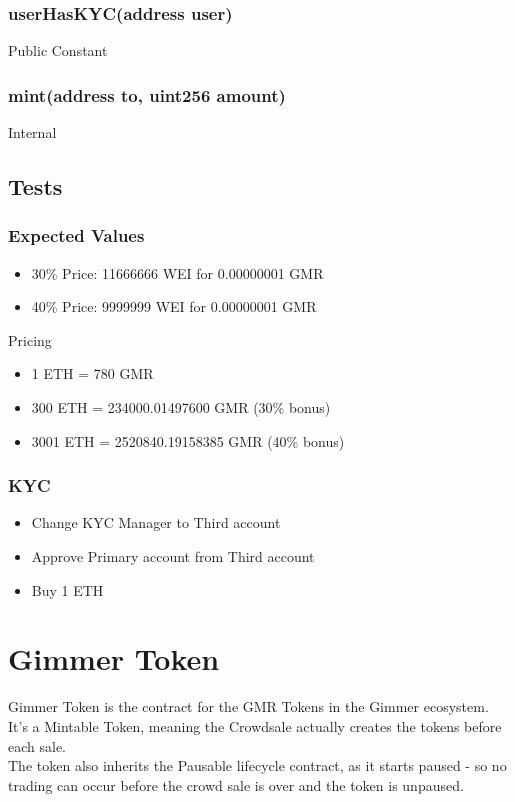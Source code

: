 \documentclass[11pt]{article} %
\begin{document}
\subsubsection{userHasKYC(address user)}
Public Constant

\subsubsection{mint(address to, uint256 amount)}
Internal

\subsection{Tests}

\subsubsection{Expected Values}

\begin{itemize}
    \item 30\% Price: 11666666 WEI for 0.00000001 GMR
    \item 40\% Price:  9999999 WEI for 0.00000001 GMR
\end{itemize}

Pricing
\begin{itemize}
    \item 1 ETH = 780 GMR
    \item 300 ETH = 234000.01497600 GMR (30\% bonus)
    \item 3001 ETH = 2520840.19158385 GMR (40\% bonus)
\end{itemize}

\subsubsection{KYC}
\begin{itemize}
    \item Change KYC Manager to Third account
    \item Approve Primary account from Third account
    \item Buy 1 ETH
\end{itemize}


\section{Gimmer Token}

Gimmer Token is the contract for the GMR Tokens in the Gimmer ecosystem.\\
It's a Mintable Token, meaning the Crowdsale actually creates the tokens before each sale.\\
The token also inherits the Pausable lifecycle contract, as it starts paused - so no trading can occur before the crowd sale is over and the token is unpaused.\\
\end{document}
